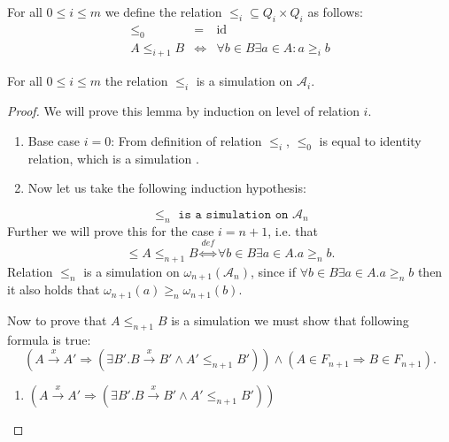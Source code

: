 \begin{defz}\label{simulation-definition}
 For all $0 \leq i \leq m$ we define the relation $\leq_i \subseteq Q_i \times
 Q_i$ as follows:
 \begin{eqnarray}
  \leq_0 & = & \text{id}\\
  A \leq_{i+1} B & \Leftrightarrow & \forall b \in B \exists a \in A: a \geq_i
  b
 \end{eqnarray}
\end{defz}

\begin{lemma}
 For all $0 \leq i \leq m$ the relation $\leq_i$ is a simulation on
 $\mathcal{A}_i$.
\end{lemma}
\begin{proof}
 We will prove this lemma by induction on level of relation $i$.
 
 \begin{enumerate}
   \item Base case $i = 0$: From definition of relation $\leq_i$, $\leq_0$ is
   equal to identity relation, which is a simulation \cite{tacas}.
   \item Now let us take the following induction hypothesis:
 \end{enumerate}
 \begin{equation}
  \leq_n \texttt{ is a simulation on } \mathcal{A}_n
 \end{equation}
 Further we will prove this for the case $i = n+1$, i.e. that
 \begin{equation}
 \leq A \leq_{n+1} B \overset{\mathit{def}}{\Leftrightarrow} \forall b \in B
 \exists a \in A. a \geq_n b.
 \end{equation}
 Relation $\leq_n$ is a simulation on $\omega_{n+1}(\mathcal{A}_n)$, since if
 $\forall b \in B \exists a \in A. a \geq_n b$ then it also holds that
 $\omega_{n+1}(a) \geq_n \omega_{n+1}(b)$.
 
 Now to prove that $A \leq_{n+1} B$ is a simulation we must show that following
 formula is true:
 \begin{equation}
 (A \overset{x}{\rightarrow} A' \Rightarrow (\exists B'. B
 \overset{x}{\rightarrow} B' \wedge A' \leq_{n+1} B')) \wedge (A \in F_{n+1}
 \Rightarrow B \in F_{n+1}).
 \end{equation}
 
  \begin{enumerate}
   \item $(A \overset{x}{\rightarrow} A' \Rightarrow (\exists B'. B
 \overset{x}{\rightarrow} B' \wedge A' \leq_{n+1} B'))$
 \end{enumerate}
 

\end{proof}
